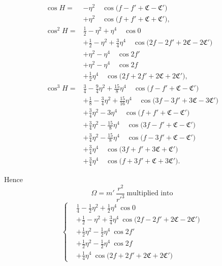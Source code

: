 \documentclass[11pt]{article}
\begin{document}
\bigskip
{}
\begin{align*}
\cos H ={}& -\eta^{2}\quad\cos\bigl(f-f'+\mathfrak{C}-\mathfrak{C}'\bigr)\\
&+\eta^{2}\quad\cos\bigl(f+f'+\mathfrak{C}+\mathfrak{C}'\bigr),\\[2pt]
\cos^{2}H ={}& \tfrac{1}{2}-\eta^{2}+\eta^{4}\quad\cos 0\\
&+\tfrac{1}{2}-\eta^{2}+\tfrac{3}{4}\eta^{4}\quad\cos\bigl(2f-2f'+2\mathfrak{C}-2\mathfrak{C}'\bigr)\\
&+\eta^{2}-\eta^{4}\quad\cos 2f'\\
&+\eta^{2}-\eta^{4}\quad\cos 2f\\
&+\tfrac{1}{2}\eta^{4}\quad\cos\bigl(2f+2f'+2\mathfrak{C}+2\mathfrak{C}'\bigr),\\[2pt]
\cos^{3}H ={}& \tfrac{3}{4}-\tfrac{9}{4}\eta^{2}+\tfrac{15}{8}\eta^{4}\quad\cos\bigl(f-f'+\mathfrak{C}-\mathfrak{C}'\bigr)\\
&+\tfrac{1}{8}-\tfrac{3}{4}\eta^{2}+\tfrac{15}{16}\eta^{4}\quad\cos\bigl(3f-3f'+3\mathfrak{C}-3\mathfrak{C}'\bigr)\\
&+\tfrac{3}{4}\eta^{2}-3\eta^{4}\quad\cos\bigl(f+f'+\mathfrak{C}-\mathfrak{C}'\bigr)\\
&+\tfrac{3}{4}\eta^{2}-\tfrac{15}{8}\eta^{4}\quad\cos\bigl(3f-f'+\mathfrak{C}-\mathfrak{C}'\bigr)\\
&+\tfrac{3}{4}\eta^{2}-\tfrac{15}{8}\eta^{4}\quad\cos\bigl(f-3f'+\mathfrak{C}-\mathfrak{C}'\bigr)\\
&+\tfrac{3}{4}\eta^{4}\quad\cos\bigl(3f+f'+3\mathfrak{C}+\mathfrak{C}'\bigr)\\
&+\tfrac{3}{4}\eta^{4}\quad\cos\bigl(f+3f'+\mathfrak{C}+3\mathfrak{C}'\bigr).
\end{align*}

\medskip
\noindent Hence
\[
\Omega = m'\,\frac{r^{2}}{r'^{3}}\ \text{multiplied into}
\]
\[
\left\{
\begin{aligned}
&\tfrac{1}{4}-\tfrac{1}{2}\eta^{2}+\tfrac{1}{2}\eta^{4}\ \cos 0\\
&+\tfrac{1}{2}-\eta^{2}+\tfrac{3}{4}\eta^{4}\ \cos\bigl(2f-2f'+2\mathfrak{C}-2\mathfrak{C}'\bigr)\\
&+\tfrac{1}{2}\eta^{2}-\tfrac{1}{2}\eta^{4}\ \cos 2f'\\
&+\tfrac{1}{2}\eta^{2}-\tfrac{1}{2}\eta^{4}\ \cos 2f\\
&+\tfrac{1}{4}\eta^{4}\ \cos\bigl(2f+2f'+2\mathfrak{C}+2\mathfrak{C}'\bigr)
\end{aligned}
\right.
\]
\end{document}
